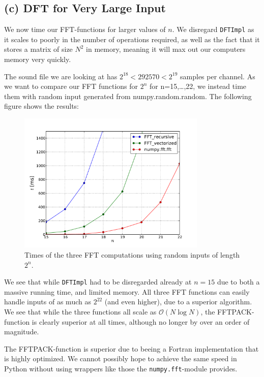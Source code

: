 \documentclass[a4paper, 11pt, notitlepage, english]{article}
\begin{document}
\subsection*{(c) DFT for Very Large Input}

We now time our FFT-functions for larger values of $n$. We disregard \verb+DFTImpl+ as it scales to poorly in the number of operations required, as well as the fact that it stores a matrix of size $N^2$ in memory, meaning it will max out our computers memory very quickly.

The sound file we are looking at has $2^{18} < 292570 < 2^{19}$ samples per channel. As we want to compare our FFT functions for $2^n$ for n=15,\ldots,22, we instead time them with random input generated from numpy.random.random. The following figure shows the results:

\begin{figure}[h]
\centering
\includegraphics[width=0.8\textwidth]{times_d}
\caption{Times of the three FFT computations using random inputs of length $2^n$.}
\end{figure}

We see that while \verb+DFTImpl+ had to be disregarded already at $n=15$ due to both a massive running time, and limited memory. All three FFT functions can easily handle inputs of as much as $2^{22}$ (and even higher), due to a superior algorithm. We see that while the three functions all scale as $\mathcal{O}(N\log N)$, the FFTPACK-function is clearly superior at all times, although no longer by over an order of magnitude.

The FFTPACK-function is superior due to beeing a Fortran implementation that is highly optimized. We cannot possibly hope to achieve the same speed in Python without using wrappers like those the \verb+numpy.fft+-module provides.
\end{document}
